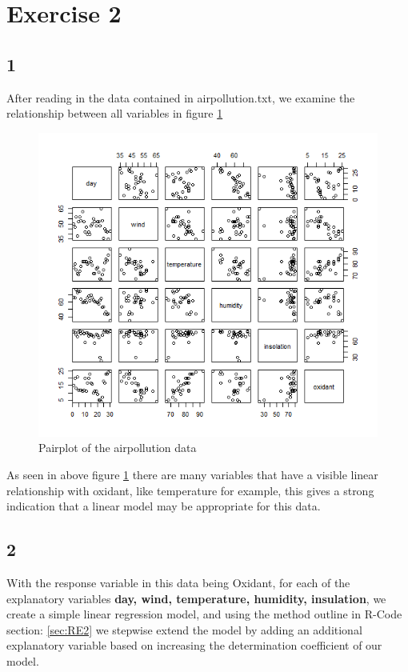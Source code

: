 \documentclass{article}
\begin{document}
  \section*{Exercise 2}
    \subsection*{1}
    After reading in the data contained in airpollution.txt, we examine the relationship between all variables in figure \ref{fig:pairs}
      \begin{figure}[H]
          \centering
          \includegraphics[scale=0.6]{../results/2_1.png}
          \caption{Pairplot of the airpollution data}
          \label{fig:pairs}
      \end{figure} 
      
   As seen in above figure \ref{fig:pairs} there are many variables that have a visible linear relationship with oxidant, like temperature for example, this gives a strong indication that a linear model may be appropriate for this data.
   
    \subsection*{2}
   With the response variable in this data being Oxidant, for each of the explanatory variables \textbf{day, wind, temperature, humidity, insulation}, we create a simple linear regression model, and using the method outline in R-Code section: \ref{sec:RE2} we stepwise extend the model by adding an additional explanatory variable based on increasing the determination coefficient of our model. 
    
\end{document}
